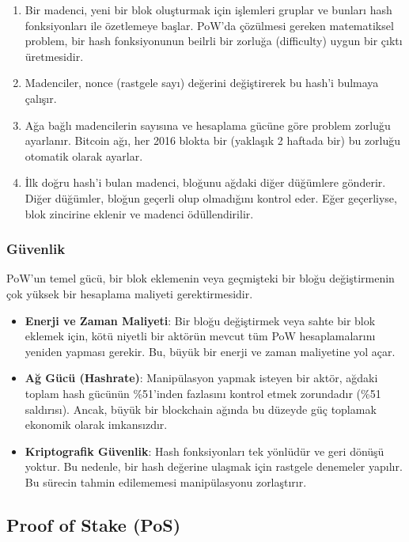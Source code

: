 \begin{enumerate}
    \item Bir madenci, yeni bir blok oluşturmak için işlemleri gruplar ve bunları hash fonksiyonları ile özetlemeye başlar. PoW'da çözülmesi gereken matematiksel problem, bir hash fonksiyonunun beilrli bir zorluğa (difficulty) uygun bir çıktı üretmesidir.
    \item Madenciler, nonce (rastgele sayı) değerini değiştirerek bu hash'i bulmaya çalışır.
    \item Ağa bağlı madencilerin sayısına ve hesaplama gücüne göre problem zorluğu ayarlanır. Bitcoin ağı, her 2016 blokta bir (yaklaşık 2 haftada bir) bu zorluğu otomatik olarak ayarlar.
    \item İlk doğru hash'i bulan madenci, bloğunu ağdaki diğer düğümlere gönderir. Diğer düğümler, bloğun geçerli olup olmadığını kontrol eder. Eğer geçerliyse, blok zincirine eklenir ve madenci ödüllendirilir.
\end{enumerate}

\subsubsection{Güvenlik}

PoW'un temel gücü, bir blok eklemenin veya geçmişteki bir bloğu değiştirmenin çok yüksek bir hesaplama maliyeti gerektirmesidir.

\begin{itemize}
    \item \textbf{Enerji ve Zaman Maliyeti}: Bir bloğu değiştirmek veya sahte bir blok eklemek için, kötü niyetli bir aktörün mevcut tüm PoW hesaplamalarını yeniden yapması gerekir. Bu, büyük bir enerji ve zaman maliyetine yol açar.
    \item \textbf{Ağ Gücü (Hashrate)}: Manipülasyon yapmak isteyen bir aktör, ağdaki toplam hash gücünün \%51'inden fazlasını kontrol etmek zorundadır (\%51 saldırısı). Ancak, büyük bir blockchain ağında bu düzeyde güç toplamak ekonomik olarak imkansızdır.
    \item \textbf{Kriptografik Güvenlik}: Hash fonksiyonları tek yönlüdür ve geri dönüşü yoktur. Bu nedenle, bir hash değerine ulaşmak için rastgele denemeler yapılır. Bu sürecin tahmin edilememesi manipülasyonu zorlaştırır.
\end{itemize}

\newpage

\subsection{Proof of Stake (PoS)}

